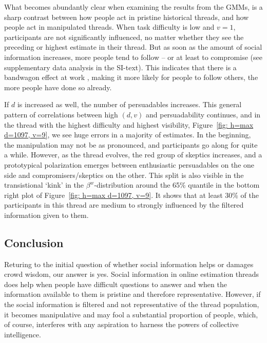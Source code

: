 \documentclass[9pt,a4paper,twocolumn,lineno]{article}
\begin{document}
What becomes abundantly clear when examining the results from the GMMs, is a sharp contrast between how people act in pristine historical threads, and how people act in manipulated threads. When task difficulty is low and $v=1$, participants are not significantly influenced, no matter whether they see the preceding or highest estimate in their thread. But as soon as the amount of social information increases, more people tend to follow – or at least to compromise (see supplementary data analysis in the SI-text). This indicates that there is a bandwagon effect at work \cite{bikhchandani1992theory, nadeau1993new, lee2018understanding}, making it more likely for people to follow others, the more people have done so already. 

If $d$ is increased as well, the number of persuadables increases. This general pattern of correlations between high $(d,v)$ and persuadability continues, and in the thread with the highest difficulty and highest visibility, Figure~\ref{fig: h=max d=1097, v=9}, we see huge errors in a majority of estimates. In the beginning, the manipulation may not be as pronounced, and participants go along for quite a while. However, as the thread evolves, the red group of skeptics increases, and a prototypical polarization emerges between enthusiastic persuadables on the one side and compromisers/skeptics on the other. This split is also visible in the transistional `kink' in the $\beta^w$-distribution around the 65\% quantile in the bottom right plot of Figure~\ref{fig: h=max d=1097, v=9}. It shows that at least 30\% of the participants in this thread are medium to strongly influenced by the filtered information given to them.

\subsection*{Conclusion}
Returing to the initial question of whether social information helps or damages crowd wisdom, our answer is yes. Social information in online estimation threads does help when people have difficult questions to answer and when the information available to them is pristine and therefore representative. However, if the social information is filtered and not representative of the thread population, it becomes manipulative and may fool a substantial proportion of people, which, of course, interferes with any aspiration to harness the powers of collective intelligence. 
\end{document}
